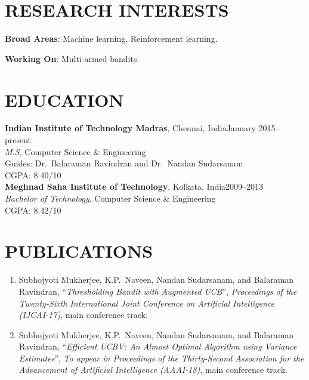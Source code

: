 \documentclass[margin,11pt]{res}
\begin{document}
\begin{resume}

\section{RESEARCH INTERESTS}
\textbf{Broad Areas}: Machine learning, Reinforcement learning.

\par
\textbf{Working On}: Multi-armed bandits.


\section{EDUCATION}
\textbf{Indian Institute of Technology Madras}, Chennai, India\hfill January 2015--present\\
{\sl M.S}, Computer Science \& Engineering
\\Guides: Dr.~Balaraman Ravindran and Dr.~Nandan Sudarsanam\\CGPA: 8.40/10
\\[0.25cm]
\textbf{Meghnad Saha Institute of Technology}, Kolkata, India\hfill 2009--2013\\
{\sl Bachelor of Technology}, Computer Science \& Engineering\\ CGPA: 8.42/10
\section{PUBLICATIONS}
\begin{enumerate}[leftmargin=*]
\item Subhojyoti Mukherjee, K.P.~Naveen, Nandan Sudarsanam, and Balaraman Ravindran, ``\textit{Thresholding Bandit with Augmented UCB}'', \textit{Proceedings of the Twenty-Sixth International Joint Conference on Artificial Intelligence (IJCAI-17)}, main conference track.
\item Subhojyoti Mukherjee, K.P.~Naveen, Nandan Sudarsanam, and Balaraman Ravindran, ``\textit{Efficient UCBV: An Almost Optimal Algorithm using Variance Estimates}'', \textit{To appear in Proceedings of the Thirty-Second Association for the Advancement of Artificial Intelligence (AAAI-18)}, main conference track.
\end{enumerate}


\end{resume}
\end{document}
